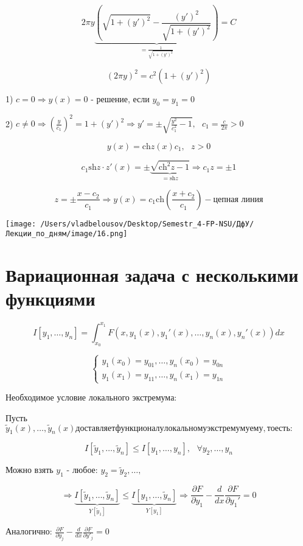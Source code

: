 \documentclass[12pt, a4paper]{report}
\begin{document}
\[ 2 \pi y \underbrace{\left( \sqrt{1 + (  y') ^2 } - \frac{ (y ' ) ^2 }{\sqrt{1 + ( y ' ) ^2 }}  \right)}_{= \frac{1}{\sqrt{ 1 + ( y ' ) ^2 }} } = C \] 

\[ ( 2 \pi y  ) ^2 = c ^2 ( 1 + ( y '   ) ^2 ) \] 

1) \( c= 0 \Rightarrow y(x )  =0  \) - решение, если \( y_0 = y_1 = 0 \) 

2) \( c \neq 0 \Rightarrow \left(  \frac{y}{c_1 }     \right) ^2 = 1 + ( y ' ) ^2 \Rightarrow y ' = \pm  \sqrt{\frac{ y ^2 }{c_1 ^2} - 1  }, \text{ }  c_1 = \frac{c}{2 \pi} > 0         \) 

\[ y( x ) = \mathrm{ch}  z(x  ) c_1 , \text{ }  z> 0 \]  

\[ c_1 \mathrm{sh } z \cdot z ' (x )   =\pm \underbrace{ \sqrt{\mathrm{ch} ^2 z - 1  }}_{= \mathrm{sh} z  }   \Rightarrow c_1 z = \pm 1   \] 

\[ z= \pm  \frac{ x- c_2 }{c_1} \Rightarrow y ( x )  = c_1 \mathrm{ch} \left( \frac{x+c_2 }{c_1}  \right)  - \text{цепная линия}  \] 

\begin{center}
    \texttt{[image: /Users/vladbelousov/Desktop/Semestr\_4-FP-NSU/ДфУ/Лекции\_по\_дням/image/16.png]}
\end{center}



\section{Вариационная задача с несколькими функциями}

\[ I[y_1, \ldots, y_n ] = \int_{x_0 }^{x_1 } F(x,y_1(x),y_1 ' (x), \ldots , y_n ( x ) , y _n '( x))dx  \] 

\[ \begin{cases}
    y_1(x_0 ) = y_{01} , \ldots , y_n ( x_0 ) = y_{0n } \\
    y_1(x_1 ) = y_{11} , \ldots , y_n ( x_1) = y_{1n }
\end{cases} \] 

Необходимое условие локального экстремума: 

Пусть \( \tilde{y }_1 (x ) ,\ldots, \tilde{y }_n( x )  доставляет функционалу локальному экстремуму ему, то есть: \)

\[ I [\tilde{y }_1, \ldots , \tilde{y}_n  ] \le I[y_1, \ldots , y_n ] , \text{ }  \forall y_2, \ldots , y_n \] 

Можно взять \( y_1   \) - любое: \( y_2=\tilde{y}_2, \ldots ,   \) 

\[\Rightarrow \underbrace{ I[\tilde{y}_1, \ldots, \tilde{y   }_n ]}_{Y[\tilde{y } _1] } \le \underbrace{I[y_1, \ldots, \tilde{y  }_n ]}_{Y[y_1 ]} \Rightarrow \frac{\partial F }{\partial  y_1} - \frac{d}{dx }  \frac{\partial  F }{\partial  y_1 '}= 0     \]  

Аналогично: \( \frac{\partial F }{\partial  y_j }- \frac{d}{dx }  \frac{\partial F }{\partial  y ' _j} = 0   \) 



\ifdefined\mainfile
\else
    
\end{document}
